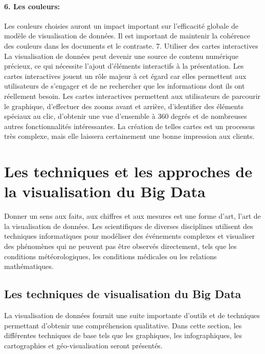 \documentclass[french, a4paper, 12pt]{report}
\begin{document}
\subsubsection{6. Les couleurs: }
Les couleurs choisies auront un impact important sur l'efficacité globale de modèle de visualisation de données. Il est important de maintenir la cohérence des couleurs dans les documents et le contraste.
7. Utiliser des cartes interactives
La visualisation de données peut devenir une source de contenu numérique précieux, ce qui nécessite l'ajout d'éléments interactifs à la présentation. Les cartes interactives jouent un rôle majeur à cet égard car elles permettent aux utilisateurs de s’engager et de ne rechercher que les informations dont ils ont réellement besoin.
Les cartes interactives permettent aux utilisateurs de parcourir le graphique, d'effectuer des zooms avant et arrière, d'identifier des éléments spéciaux au clic, d'obtenir une vue d'ensemble à 360 degrés et de nombreuses autres fonctionnalités intéressantes. La création de telles cartes est un processus très complexe, mais elle laissera certainement une bonne impression aux clients.



\chapter{Les techniques et les approches de la visualisation du Big Data}
Donner un sens aux faits, aux chiffres et aux mesures est une forme d'art, l'art de la visualisation de données. Les scientifiques de diverses disciplines utilisent des techniques informatiques pour modéliser des événements complexes et visualiser des phénomènes qui ne peuvent pas être observés directement, tels que les conditions météorologiques, les conditions médicales ou les relations mathématiques.
\section{Les techniques de visualisation du Big Data}
La visualisation de données fournit une suite importante d’outils et de techniques permettant d’obtenir une compréhension qualitative. Dans cette section, les différentes techniques de base tels que les graphiques, les infographiques,  les cartographies et géo-visualisation seront présentés.
\end{document}
